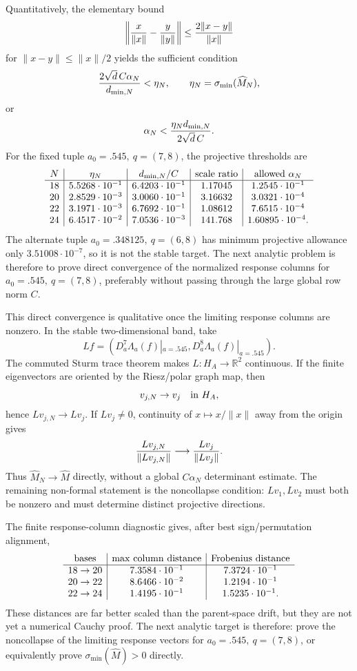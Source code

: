 \documentclass[11pt]{article}
\begin{document}
Quantitatively, the elementary bound
\[
  \left\|{x\over \|x\|}-{y\over \|y\|}\right\|
  \le {2\|x-y\|\over \|x\|}
\]
for \(\|x-y\|\le \|x\|/2\) yields the sufficient condition
\[
  {2\sqrt d\,C\alpha_N\over d_{\min,N}}<\eta_N,\qquad
  \eta_N=\sigma_{\min}(\widehat M_N),
\]
or
\[
  \alpha_N < {\eta_N d_{\min,N}\over 2\sqrt d\,C}.
\]
For the fixed tuple \(a_0=.545,\ q=(7,8)\), the projective thresholds are
\[
\begin{array}{c|c|c|c|c}
N&\eta_N&d_{\min,N}/C&{\rm scale\ ratio}&{\rm allowed\ }\alpha_N\\\hline
18&5.5268\cdot10^{-1}&6.4203\cdot10^{-1}&1.17045&1.2545\cdot10^{-1}\\
20&2.8529\cdot10^{-3}&3.0060\cdot10^{-1}&3.16632&3.0321\cdot10^{-4}\\
22&3.1971\cdot10^{-3}&6.7692\cdot10^{-1}&1.08612&7.6515\cdot10^{-4}\\
24&6.4517\cdot10^{-2}&7.0536\cdot10^{-3}&141.768&1.60895\cdot10^{-4}.
\end{array}
\]
The alternate tuple \(a_0=.348125,\ q=(6,8)\) has minimum projective allowance
only \(3.51008\cdot10^{-7}\), so it is not the stable target.  The next
analytic problem is therefore to prove direct convergence of the normalized
response columns for \(a_0=.545,\ q=(7,8)\), preferably without passing through
the large global row norm \(C\).

This direct convergence is qualitative once the limiting response columns are
nonzero.  In the stable two-dimensional band, take
\[
  Lf=\left(D_a^7\Lambda_a(f)|_{a=.545},
           D_a^8\Lambda_a(f)|_{a=.545}\right).
\]
The commuted Sturm trace theorem makes \(L:H_A\to\mathbb R^2\) continuous.  If
the finite eigenvectors are oriented by the Riesz/polar graph map, then
\[
  v_{j,N}\to v_j\quad{\rm in}\ H_A,
\]
hence \(Lv_{j,N}\to Lv_j\).  If \(Lv_j\ne0\), continuity of
\(x\mapsto x/\|x\|\) away from the origin gives
\[
  {Lv_{j,N}\over \|Lv_{j,N}\|}
  \longrightarrow
  {Lv_j\over \|Lv_j\|}.
\]
Thus \(\widehat M_N\to\widehat M\) directly, without a global \(C\alpha_N\)
determinant estimate.  The remaining non-formal statement is the noncollapse
condition: \(Lv_1,Lv_2\) must both be nonzero and must determine distinct
projective directions.

The finite response-column diagnostic gives, after best sign/permutation
alignment,
\[
\begin{array}{c|c|c}
{\rm bases}&{\rm max\ column\ distance}&{\rm Frobenius\ distance}\\\hline
18\to20&7.3584\cdot10^{-1}&7.3724\cdot10^{-1}\\
20\to22&8.6466\cdot10^{-2}&1.2194\cdot10^{-1}\\
22\to24&1.4195\cdot10^{-1}&1.5235\cdot10^{-1}.
\end{array}
\]
These distances are far better scaled than the parent-space drift, but they
are not yet a numerical Cauchy proof.  The next analytic target is therefore:
prove the noncollapse of the limiting response vectors for
\(a_0=.545,\ q=(7,8)\), or equivalently prove
\(\sigma_{\min}(\widehat M)>0\) directly.
\end{document}
